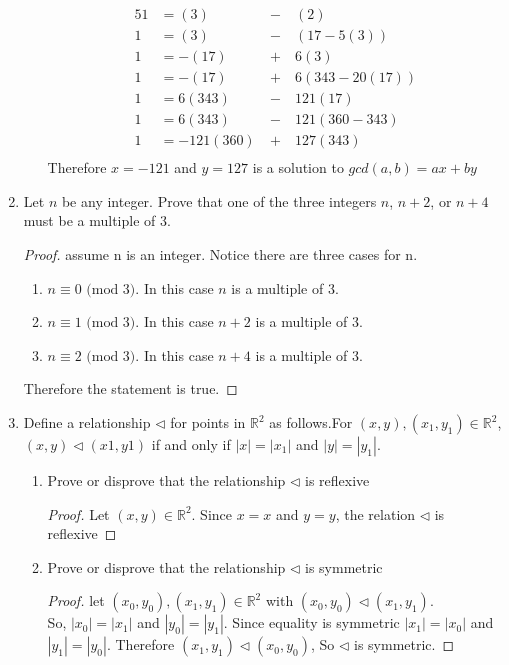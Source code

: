 \documentclass{article}
\newcommand{\R}{\mathbb{R}}
\begin{document}
\begin{enumerate}
\begin{enumerate}
		\begin{alignat*}{5}
			1 &= (3)   \ &-\ &(2) \\
			1 &= (3)   \ &-\ &(17-5(3)) \\
			1 &= -(17) \ &+\ &6(3) \\
			1 &= -(17) \ &+\ &6(343-20(17)) \\
			1 &= 6(343)\ &-\ &121(17) \\
			1 &= 6(343)\ &-\ &121(360-343) \\
			1 &= -121(360)\ &+\ &127(343) \\
		\end{alignat*}
		Therefore $x= -121$ and $y =127$ is a solution to  $gcd(a,b) = ax + by$
	\end{enumerate}
	 
	\item Let $n$ be any integer. Prove that one of the three integers $n$, $n + 2$, or $n + 4$ must be a multiple of 3. 
	\begin{proof}
		assume n is an integer. Notice there are three cases for n.
		\begin{enumerate}[label=Case \arabic*:]
			\item $n\equiv 0 \text{ (mod 3)}.$
				In this case $n$ is a multiple of 3.
			
			\item $n\equiv 1 \text{ (mod 3)}.$
				In this case $n+2$ is a multiple of 3.
			
			\item $n\equiv 2 \text{ (mod 3)}.$
				In this case $n+4$ is a multiple of 3.
		\end{enumerate}
		Therefore the statement is true.
	\end{proof}
			
	\item Define a relationship $\triangleleft$ for points in $\R^2$ as follows.For $(x, y), (x_1 , y_1) \in \R^2$,
	$(x, y) \triangleleft (x1 , y1)$ if and only if $|x| = |x_1|$ and $|y| = |y_1|$.
	\begin{enumerate}
		\item Prove or disprove that the relationship $\triangleleft$ is reflexive
		\begin{proof}
			Let $(x,y) \in \R^2$. 
			Since $x=x$ and $y=y$, the relation $\triangleleft$ is reflexive
		\end{proof}
		
		\item Prove or disprove that the relationship $\triangleleft$ is symmetric 
		\begin{proof}
			let $(x_0,y_0), (x_1,y_1) \in \R^2$ with $(x_0,y_0) \triangleleft (x_1,y_1)$.\\
			So, $|x_0| = |x_1|$ and $|y_0| = |y_1|$. Since equality is symmetric $|x_1| = |x_0|$ and $|y_1| = |y_0|$.
			Therefore $(x_1,y_1) \triangleleft (x_0,y_0)$, So $\triangleleft$ is symmetric. 
			

\end{proof}
\end{enumerate}
\end{enumerate}
\end{document}
